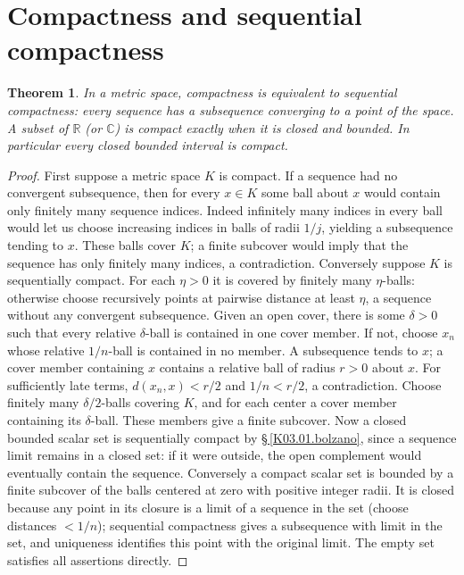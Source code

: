 \documentclass[11pt,oneside,a4paper]{book}
\newtheorem{theorem}{Theorem}[chapter]
\theoremstyle{definition}
\theoremstyle{remark}
\newcommand{\R}{\mathbb R}
\newcommand{\C}{\mathbb C}
\newcommand{\KEntry}[2]{\Needspace{7\baselineskip}\section{#2}\label{#1}{\small\sffamily\color{black!60}\detokenize{#1}}\par}
\newcommand{\KRef}[1]{\hyperref[#1]{\S\,\ref*{#1}}}
\begin{document}
\KEntry{K03.03.compact_interval}{Compactness and sequential compactness}
\begin{theorem}
In a metric space, compactness is equivalent to sequential compactness: every sequence has a subsequence converging to a point of the space. A subset of $\R$ (or $\C$) is compact exactly when it is closed and bounded. In particular every closed bounded interval is compact.
\end{theorem}
\begin{proof}
First suppose a metric space $K$ is compact. If a sequence had no convergent subsequence, then for every $x\in K$ some ball about $x$ would contain only finitely many sequence indices. Indeed infinitely many indices in every ball would let us choose increasing indices in balls of radii $1/j$, yielding a subsequence tending to $x$. These balls cover $K$; a finite subcover would imply that the sequence has only finitely many indices, a contradiction.
Conversely suppose $K$ is sequentially compact. For each $\eta>0$ it is covered by finitely many $\eta$-balls: otherwise choose recursively points at pairwise distance at least $\eta$, a sequence without any convergent subsequence. Given an open cover, there is some $\delta>0$ such that every relative $\delta$-ball is contained in one cover member. If not, choose $x_n$ whose relative $1/n$-ball is contained in no member. A subsequence tends to $x$; a cover member containing $x$ contains a relative ball of radius $r>0$ about $x$. For sufficiently late terms, $d(x_n,x)<r/2$ and $1/n<r/2$, a contradiction. Choose finitely many $\delta/2$-balls covering $K$, and for each center a cover member containing its $\delta$-ball. These members give a finite subcover.
Now a closed bounded scalar set is sequentially compact by \KRef{K03.01.bolzano}, since a sequence limit remains in a closed set: if it were outside, the open complement would eventually contain the sequence. Conversely a compact scalar set is bounded by a finite subcover of the balls centered at zero with positive integer radii. It is closed because any point in its closure is a limit of a sequence in the set (choose distances $<1/n$); sequential compactness gives a subsequence with limit in the set, and uniqueness identifies this point with the original limit. The empty set satisfies all assertions directly.
\end{proof}
\end{document}
